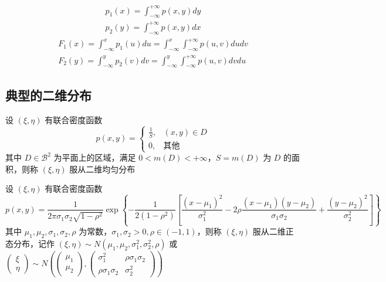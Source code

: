 \documentclass[12pt,a4paper]{amsart}
\begin{document}
\begin{definition}[连续型边缘分布]
    \begin{equation}
        \begin{aligned}
            p_1(x) = \int_{-\infty}^{+\infty}p(x, y)dy \\
            p_2(y) = \int_{-\infty}^{+\infty}p(x, y)dx
        \end{aligned}
    \end{equation}
    \begin{equation}
        \begin{aligned}
            F_1(x) = \int_{-\infty}^{x}p_1(u)du = \int_{-\infty}^{x}\int_{-\infty}^{+\infty}p(u, v)dudv \\
            F_2(y) = \int_{-\infty}^{y}p_2(v)dv = \int_{-\infty}^{y}\int_{-\infty}^{+\infty}p(u, v)dvdu
        \end{aligned}
    \end{equation}
\end{definition}

\subsection{典型的二维分布}

\begin{definition}[二维均匀分布]
    设 $(\xi, \eta)$ 有联合密度函数
    \begin{equation}
        p(x, y) = \begin{cases}
            \frac{1}{S}, & (x, y)\in D \\
            0, & \text{其他}
        \end{cases}
    \end{equation}
    其中 $D\in\mathcal{B}^2$ 为平面上的区域，满足 $0 < m(D) < +\infty$，$S = m(D)$ 为 $D$ 的面积，则称 $(\xi, \eta)$ 服从二维均匀分布
\end{definition}

\begin{definition}[二维正态分布]
    设 $(\xi, \eta)$ 有联合密度函数
    \begin{equation}
        p(x, y) = \frac{1}{2\pi\sigma_1\sigma_2\sqrt{1-\rho^2}}\exp\left\{-\frac{1}{2(1-\rho^2)}\left[\frac{(x-\mu_1)^2}{\sigma_1^2}-2\rho\frac{(x-\mu_1)(y-\mu_2)}{\sigma_1\sigma_2}+\frac{(y-\mu_2)^2}{\sigma_2^2}\right]\right\}
    \end{equation}
    其中 $\mu_1, \mu_2, \sigma_1, \sigma_2, \rho$ 为常数，$\sigma_1, \sigma_2 > 0, \rho\in(-1, 1)$，则称 $(\xi, \eta)$ 服从二维正态分布，记作 $(\xi, \eta)\sim N(\mu_1, \mu_2, \sigma_1^2, \sigma_2^2, \rho)$ 或 $\begin{pmatrix} \xi \\ \eta \end{pmatrix} \sim N \left( \begin{pmatrix} \mu_1 \\ \mu_2 \end{pmatrix}, \begin{pmatrix} \sigma_1^2 & \rho\sigma_1\sigma_2 \\ \rho\sigma_1\sigma_2 & \sigma_2^2 \end{pmatrix} \right)$
\end{definition}
\end{document}
